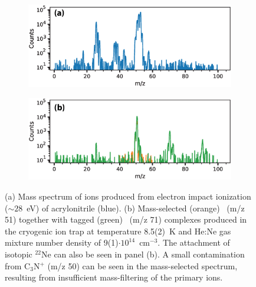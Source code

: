 \begin{figure}[tb]
    \centering
     \begin{subfigure}[b]{0.48\textwidth}
         \centering
         \includegraphics[width=1\textwidth]{chapters/HC3N+/figures/masspec/modified/HC3N+_masspec.eps}
         \label{fig:HC3N+masspec:background}
     \end{subfigure}
     \hfill
     \begin{subfigure}[b]{0.49\textwidth}
         \centering
         \includegraphics[width=1\textwidth]{chapters/HC3N+/figures/masspec/modified/HC3N+_masspec_complex.eps}
         \label{fig:HC3N+masspec:complex}
     \end{subfigure}
    \caption{(a) Mass spectrum of ions produced from electron impact ionization ($\sim 28$~eV) of acrylonitrile (blue). (b) Mass-selected (orange) \ion\ (m/z  51) together with tagged (green) \neion\ (m/z  71) complexes produced in the cryogenic ion trap at temperature 8.5(2)~K and He:Ne gas mixture number density of 9(1)$\cdot 10^{14}$~cm$^{-3}$. The attachment of isotopic $^{22}$Ne can also be seen in panel (b).  A small contamination from C$_3$N$^+$ (m/z 50) can be seen in the mass-selected spectrum, resulting from insufficient mass-filtering of the primary ions.}
    \label{fig:HC3N+masspec}
\end{figure}

